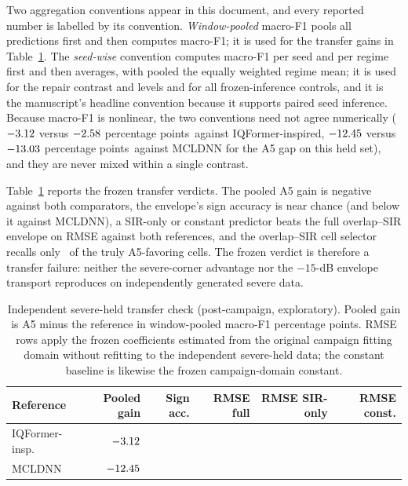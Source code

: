 \documentclass[letterpaper,onecolumn,11pt,journal]{IEEEtran}
\newcommand{\pp}{percentage points}
\begin{document}
Two aggregation conventions appear in this document, and every reported
number is labelled by its convention. \emph{Window-pooled} macro-F1 pools all
predictions first and then computes macro-F1; it is used for the transfer
gains in Table~\ref{tab:s5a}. The \emph{seed-wise} convention computes
macro-F1 per seed and per regime first and then averages, with pooled the
equally weighted regime mean; it is used for the repair contrast and levels
and for all frozen-inference controls, and it is the manuscript's headline
convention because it supports paired seed inference. Because macro-F1 is
nonlinear, the two conventions need not agree numerically
($-3.12$ versus $-2.58$ \pp\
against IQFormer-inspired, $-12.45$ versus
$-13.03$ \pp\ against MCLDNN for the A5 gap on this held
set), and they are never mixed within a single contrast.

Table~\ref{tab:s5a} reports the frozen transfer verdicts. The pooled
A5 gain is negative against both comparators, the envelope's sign accuracy
is near chance (and below it against MCLDNN), a SIR-only or constant
predictor beats the full overlap--SIR envelope on RMSE against both
references, and the overlap--SIR cell selector recalls only
\SevereTransferSelectorRecall\ of the truly A5-favoring cells. The
frozen verdict is therefore a transfer failure: neither the
severe-corner advantage nor the $-15$-dB envelope transport reproduces on
independently generated severe data.

\begin{table}[t]
\centering
\caption{Independent severe-held transfer check (post-campaign, exploratory).
Pooled gain is A5 minus the reference in window-pooled macro-F1 \pp. RMSE
rows apply the frozen coefficients estimated from the original campaign
fitting domain without refitting to the independent severe-held data; the
constant baseline is likewise the frozen campaign-domain constant.}
\label{tab:s5a}
\footnotesize
\setlength{\tabcolsep}{2.4pt}
\begin{tabular}{lrrrrr}
\toprule
Reference & Pooled gain & Sign acc. & RMSE full & RMSE SIR-only & RMSE const.\\
\midrule
IQFormer-insp. & $-3.12$ & \SevereTransferSignAccIqformer
& \SevereTransferRmseIqformerFull & \SevereTransferRmseIqformerSirOnly
& \SevereTransferRmseIqformerConstant\\
MCLDNN & $-12.45$ & \SevereTransferSignAccMcldnn
& \SevereTransferRmseMcldnnFull & \SevereTransferRmseMcldnnSirOnly
& \SevereTransferRmseMcldnnConstant\\
\bottomrule
\end{tabular}
\end{table}
\end{document}
